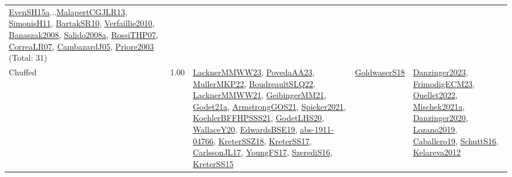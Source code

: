 {\begin{longtable}{p{3cm}r>{\raggedright\arraybackslash}p{6cm}>{\raggedright\arraybackslash}p{6cm}>{\raggedright\arraybackslash}p{8cm}}
\hyperref[detail:EvenSH15a]{EvenSH15a}...\hyperref[detail:MalapertCGJLR13]{MalapertCGJLR13}, \hyperref[detail:SimonisH11]{SimonisH11}, \hyperref[detail:BartakSR10]{BartakSR10}, \hyperref[detail:Verfaillie2010]{Verfaillie2010}, \hyperref[detail:Banaszak2008]{Banaszak2008}, \hyperref[detail:Salido2008a]{Salido2008a}, \hyperref[detail:RossiTHP07]{RossiTHP07}, \hyperref[detail:CorreaLR07]{CorreaLR07}, \hyperref[detail:CambazardJ05]{CambazardJ05}, \hyperref[detail:Priore2003]{Priore2003} (Total: 31)\\
\index{Chuffed}\index{CPSystems!Chuffed}Chuffed &  1.00 & \hyperref[detail:LacknerMMWW23]{LacknerMMWW23}, \hyperref[detail:PovedaAA23]{PovedaAA23}, \hyperref[detail:MullerMKP22]{MullerMKP22}, \hyperref[detail:BoudreaultSLQ22]{BoudreaultSLQ22}, \hyperref[detail:LacknerMMWW21]{LacknerMMWW21}, \hyperref[detail:GeibingerMM21]{GeibingerMM21}, \hyperref[detail:Godet21a]{Godet21a}, \hyperref[detail:ArmstrongGOS21]{ArmstrongGOS21}, \hyperref[detail:Spieker2021]{Spieker2021}, \hyperref[detail:KoehlerBFFHPSSS21]{KoehlerBFFHPSSS21}, \hyperref[detail:GodetLHS20]{GodetLHS20}, \hyperref[detail:WallaceY20]{WallaceY20}, \hyperref[detail:EdwardsBSE19]{EdwardsBSE19}, \hyperref[detail:abs-1911-04766]{abs-1911-04766}, \hyperref[detail:KreterSSZ18]{KreterSSZ18}, \hyperref[detail:KreterSS17]{KreterSS17}, \hyperref[detail:CarlssonJL17]{CarlssonJL17}, \hyperref[detail:YoungFS17]{YoungFS17}, \hyperref[detail:SzerediS16]{SzerediS16}, \hyperref[detail:KreterSS15]{KreterSS15} & \hyperref[detail:GoldwaserS18]{GoldwaserS18} & \hyperref[detail:Danzinger2023]{Danzinger2023}, \hyperref[detail:FrimodigECM23]{FrimodigECM23}, \hyperref[detail:Ouellet2022]{Ouellet2022}, \hyperref[detail:Mischek2021a]{Mischek2021a}, \hyperref[detail:Danzinger2020]{Danzinger2020}, \hyperref[detail:Lozano2019]{Lozano2019}, \hyperref[detail:Caballero19]{Caballero19}, \hyperref[detail:SchuttS16]{SchuttS16}, \hyperref[detail:Kelareva2012]{Kelareva2012}\\

\end{longtable}}
